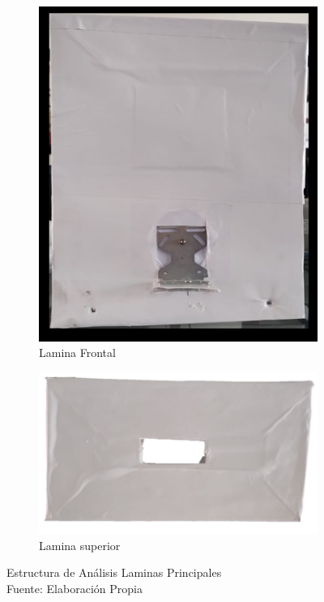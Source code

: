 \begin{figure}[ht]
	\centering
	\begin{subfigure}{0.47\linewidth}
		\centering
		\includegraphics[scale=0.4]{Figs/300.png}
		\caption{Lamina Frontal}
		\label{fig:frontal}
	\end{subfigure}
	\begin{subfigure}{0.47\linewidth}
		\centering
		\includegraphics[scale=0.6]{Figs/301.png}
		\caption{Lamina superior}
		\label{fig:superior}
	\end{subfigure}
	\caption{Estructura de Análisis Laminas Principales\\
		Fuente: Elaboración Propia}
	\label{fig:estructura}
\end{figure}
 
\vspace{1cm}

